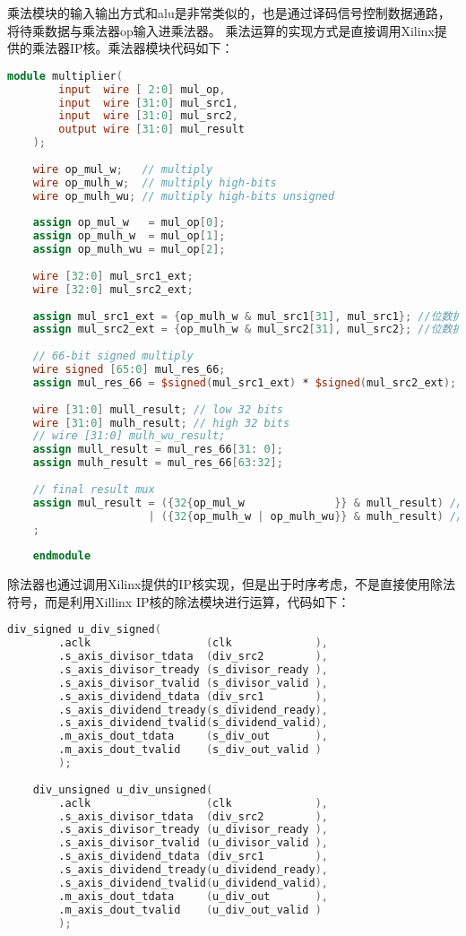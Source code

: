 \documentclass[11pt]{article}
\begin{document}
乘法模块的输入输出方式和alu是非常类似的，也是通过译码信号控制数据通路，将待乘数据与乘法器op输入进乘法器。
乘法运算的实现方式是直接调用Xilinx提供的乘法器IP核。乘法器模块代码如下：
\begin{lstlisting}[language=Verilog]
    module multiplier(
        input  wire [ 2:0] mul_op,
        input  wire [31:0] mul_src1,
        input  wire [31:0] mul_src2,
        output wire [31:0] mul_result
    );
    
    wire op_mul_w;   // multiply
    wire op_mulh_w;  // multiply high-bits
    wire op_mulh_wu; // multiply high-bits unsigned
    
    assign op_mul_w   = mul_op[0];
    assign op_mulh_w  = mul_op[1];
    assign op_mulh_wu = mul_op[2];
    
    wire [32:0] mul_src1_ext;
    wire [32:0] mul_src2_ext;
    
    assign mul_src1_ext = {op_mulh_w & mul_src1[31], mul_src1}; //位数扩展
    assign mul_src2_ext = {op_mulh_w & mul_src2[31], mul_src2}; //位数扩展
    
    // 66-bit signed multiply
    wire signed [65:0] mul_res_66;
    assign mul_res_66 = $signed(mul_src1_ext) * $signed(mul_src2_ext); // 直接调用Xillinx IP实现乘法功能
    
    wire [31:0] mull_result; // low 32 bits
    wire [31:0] mulh_result; // high 32 bits
    // wire [31:0] mulh_wu_result;
    assign mull_result = mul_res_66[31: 0];
    assign mulh_result = mul_res_66[63:32];
    
    // final result mux
    assign mul_result = ({32{op_mul_w              }} & mull_result) //选取低32位
                      | ({32{op_mulh_w | op_mulh_wu}} & mulh_result) //选取高32位
    ;
    
    endmodule
\end{lstlisting}

除法器也通过调用Xilinx提供的IP核实现，但是出于时序考虑，不是直接使用除法符号，而是利用Xillinx IP核的除法模块进行运算，代码如下：
\begin{lstlisting}[language=Verilog]
    div_signed u_div_signed(
        .aclk                  (clk             ),
        .s_axis_divisor_tdata  (div_src2        ),
        .s_axis_divisor_tready (s_divisor_ready ),
        .s_axis_divisor_tvalid (s_divisor_valid ),
        .s_axis_dividend_tdata (div_src1        ),
        .s_axis_dividend_tready(s_dividend_ready),
        .s_axis_dividend_tvalid(s_dividend_valid),
        .m_axis_dout_tdata     (s_div_out       ),
        .m_axis_dout_tvalid    (s_div_out_valid )
        );
    
    div_unsigned u_div_unsigned(
        .aclk                  (clk             ),
        .s_axis_divisor_tdata  (div_src2        ),
        .s_axis_divisor_tready (u_divisor_ready ),
        .s_axis_divisor_tvalid (u_divisor_valid ),
        .s_axis_dividend_tdata (div_src1        ),
        .s_axis_dividend_tready(u_dividend_ready),
        .s_axis_dividend_tvalid(u_dividend_valid),
        .m_axis_dout_tdata     (u_div_out       ),
        .m_axis_dout_tvalid    (u_div_out_valid )
        );
\end{lstlisting}
\end{document}

